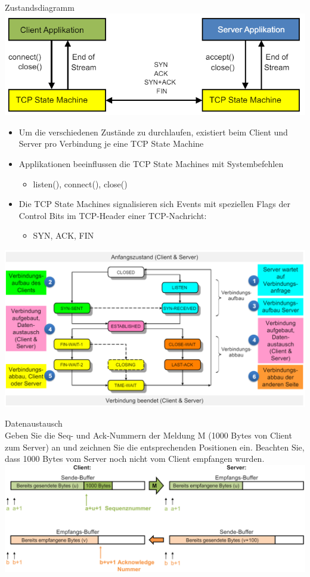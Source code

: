 \begin{concept}{Zustandsdiagramm}\\
    \includegraphics[width=0.5\linewidth]{images/short_overview_zustandsdiagramm.png}
    \begin{itemize}
        \item Um die verschiedenen Zustände zu durchlaufen, existiert beim Client und Server pro Verbindung je eine TCP State Machine
        \item Applikationen beeinflussen die TCP State Machines mit Systembefehlen
        \begin{itemize}
            \item listen(), connect(), close()
        \end{itemize}
        \item Die TCP State Machines signalisieren sich Events mit speziellen Flags der Control Bits im TCP-Header einer TCP-Nachricht:
        \begin{itemize}
            \item SYN, ACK, FIN
        \end{itemize}
    \end{itemize}
    \includegraphics[width=1\linewidth]{images/zustandsdiagramm_tcp.png}
\end{concept}

\begin{example2}{Datenaustausch}\\
    Geben Sie die Seq- und Ack-Nummern der Meldung M (1000 Bytes von Client zum Server) an und zeichnen Sie die entsprechenden Positionen ein. Beachten Sie, dass 1000 Bytes vom Server noch nicht vom Client empfangen wurden.\\
    \includegraphics[width=1\linewidth]{images/datenaustausch_tcp_example.png}
\end{example2}

